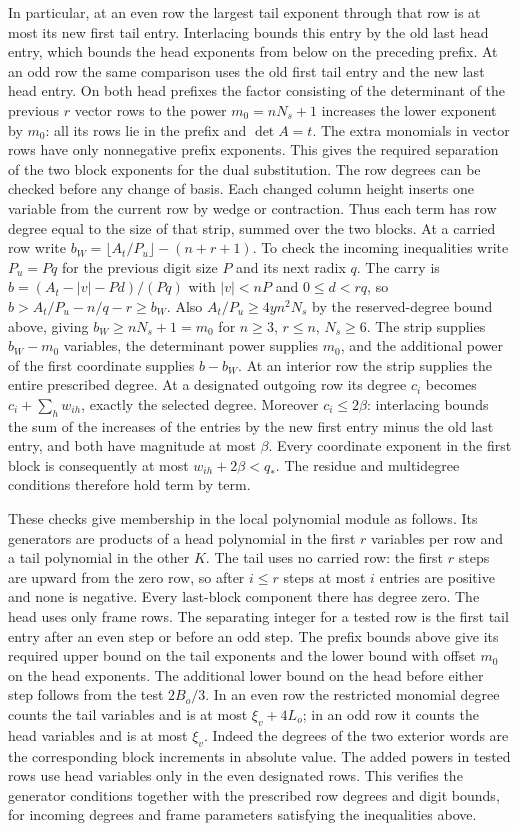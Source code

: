 \documentclass[11pt]{amsart}
\theoremstyle{definition}
\theoremstyle{remark}
\begin{document}
In particular, at an even row the largest tail exponent through
that row is at most its new first tail entry. Interlacing bounds
this entry by the old last head entry, which bounds the head
exponents from below on the preceding prefix. At an odd row the
same comparison uses the old first tail entry and the new last
head entry. On both head prefixes the factor consisting of the
determinant of the previous $r$ vector rows to the power
$m_0=nN_s+1$ increases the lower exponent by $m_0$: all its
rows lie in the prefix and $\det A=t$. The extra monomials in
vector rows have only nonnegative prefix exponents. This gives
the required separation of the two block exponents for the dual
substitution. The row degrees can be checked before any change
of basis. Each changed column height inserts one variable from
the current row by wedge or contraction. Thus each term has
row degree equal to the size of that strip, summed over the two
blocks. At a carried row write
$b_W=\lfloor A_t/P_u\rfloor-(n+r+1)$. To check the incoming
inequalities write $P_u=Pq$ for the previous digit size $P$
and its next radix $q$. The carry is
$b=(A_t-|v|-Pd)/(Pq)$ with $|v|<nP$ and $0\le d<rq$, so
$b>A_t/P_u-n/q-r\ge b_W$. Also $A_t/P_u\ge4yn^2N_s$
by the reserved-degree bound above, giving $b_W\ge nN_s+1=m_0$
for $n\ge3$, $r\le n$, $N_s\ge6$. The strip supplies $b_W-m_0$ variables,
the determinant power supplies $m_0$, and the additional power
of the first coordinate supplies $b-b_W$. At an interior row the
strip supplies the entire prescribed degree. At a designated
outgoing row its degree $c_i$ becomes $c_i+\sum_h w_{ih}$, exactly
the selected degree. Moreover $c_i\le2\beta$: interlacing bounds
the sum of the increases of the entries by the new first entry
minus the old last entry, and both have magnitude at most $\beta$.
Every coordinate exponent in the first block is consequently
at most $w_{ih}+2\beta<q_*$. The residue and multidegree
conditions therefore hold term by term.

These checks give membership in the local polynomial module as
follows. Its generators are products of a head polynomial in the
first $r$ variables per row and a tail polynomial in the other
$K$. The tail uses no carried row: the first $r$ steps are
upward from the zero row, so after $i\le r$ steps at most $i$
entries are positive and none is negative. Every last-block
component there has degree zero. The head uses only frame rows.
The separating integer for a tested row is the first tail entry
after an even step or before an odd step. The prefix bounds above
give its required upper bound on the tail exponents and the lower
bound with offset $m_0$ on the head exponents. The additional
lower bound on the head before either step follows from the test
$2B_o/3$. In an even row the restricted monomial degree counts
the tail variables and is at most $\xi_v+4L_o$; in an odd row
it counts the head variables and is at most $\xi_v$. Indeed the
degrees of the two exterior words are the corresponding block
increments in absolute value. The added powers in tested rows
use head variables only in the even designated rows. This
verifies the generator conditions together with the prescribed
row degrees and digit bounds, for incoming degrees and frame
parameters satisfying the inequalities above.
\end{document}
